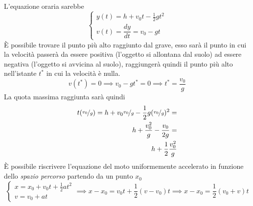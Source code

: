 \documentclass[10pt, letterpaper]{report}
\begin{document}
L'equazione oraria sarebbe$$ \begin{cases}
    y(t)=h+v_0t-\frac{1}{2}gt^2 \\ 
    v(t)=\dfrac{dy}{dt}=v_0-gt
\end{cases}$$
È possibile trovare il punto più alto raggiunto dal grave, esso sarà il punto in cui la velocità 
passerà da essere positiva (l'oggetto si allontana dal suolo) ad essere negativa (l'oggetto si avvicina al suolo), 
raggiungerà quindi il punto più alto nell'istante $t^*$ in cui la velocità è nulla. 
$$ v(t^*)=0\implies v_0-gt^* = 0 \implies t^*=\frac{v_0}{g}$$
La quota massima raggiunta sarà quindi 
\begin{eqnarray}
    t(\nicefrac{v_0}{g}) = h+v_0\nicefrac{v_0}{g}-\frac{1}{2}g(\nicefrac{v_0}{g})^2 =\\ 
    h+\frac{v_0^2}{g}-\frac{v_0}{2g} = \\ 
    h+\frac{1}{2}\frac{v_0^2}{g}
\end{eqnarray}
È possibile riscrivere l'equazione del moto uniformemente accelerato in funzione dello 
\textit{spazio percorso} partendo da un punto $x_0$ 
$$ \begin{cases}
    x=x_0+v_0t+\frac{1}{2}at^2\\ 
    v=v_0+at
\end{cases}\implies x-x_0=v_0t+\frac{1}{2}(v-v_0)t \implies x-x_0=\frac{1}{2}(v_0+v)t$$
\end{document}
